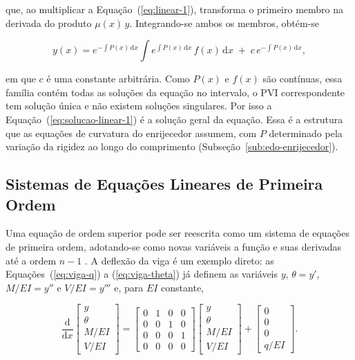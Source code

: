 \documentclass[arial,centeredequations,english,brazilian,oneside,section=TITLE]{ifes8}
\begin{document}
que, ao multiplicar a Equação~(\ref{eq:linear-1}), transforma o primeiro membro na
derivada do produto $\mu(x)\,y$. Integrando-se ambos os membros, obtém-se

\begin{equation}
  \label{eq:solucao-linear-1}
  y(x) = e^{-\int P(x)\,\mathrm{d}x} \int e^{\int P(x)\,\mathrm{d}x}\, f(x)\,\mathrm{d}x
  \;+\; c\,e^{-\int P(x)\,\mathrm{d}x},
\end{equation}

em que $c$ é uma constante arbitrária. Como $P(x)$ e $f(x)$ são contínuas, essa família
contém todas as soluções da equação no intervalo, o PVI correspondente tem solução única
e não existem soluções singulares. Por isso a
Equação~(\ref{eq:solucao-linear-1}) é a solução geral da equação. Essa é a estrutura que
as equações de curvatura do enrijecedor assumem, com $P$ determinado pela variação da
rigidez ao longo do comprimento (Subseção~\ref{sub:edo-enrijecedor}).
 
\subsection{Sistemas de Equações Lineares de Primeira Ordem}
\label{sub:sistemas-lineares}
 
Uma equação de ordem superior pode ser reescrita como um sistema de equações de primeira
ordem, adotando-se como novas variáveis a função e suas derivadas até a ordem $n - 1$
\cite{Zill2001v2}. A deflexão da viga é um exemplo direto: as
Equações~(\ref{eq:viga-q}) a (\ref{eq:viga-theta}) já definem as variáveis $y$,
$\theta = y'$, $M/EI = y''$ e $V/EI = y'''$ e, para $EI$ constante,

\begin{equation}
  \label{eq:viga-sistema}
  \frac{\mathrm{d}}{\mathrm{d}x}
  \begin{bmatrix} y \\ \theta \\ M/EI \\ V/EI \end{bmatrix}
  =
  \begin{bmatrix}
    0 & 1 & 0 & 0 \\
    0 & 0 & 1 & 0 \\
    0 & 0 & 0 & 1 \\
    0 & 0 & 0 & 0
  \end{bmatrix}
  \begin{bmatrix} y \\ \theta \\ M/EI \\ V/EI \end{bmatrix}
  +
  \begin{bmatrix} 0 \\ 0 \\ 0 \\ q/EI \end{bmatrix}.
\end{equation}
\end{document}
